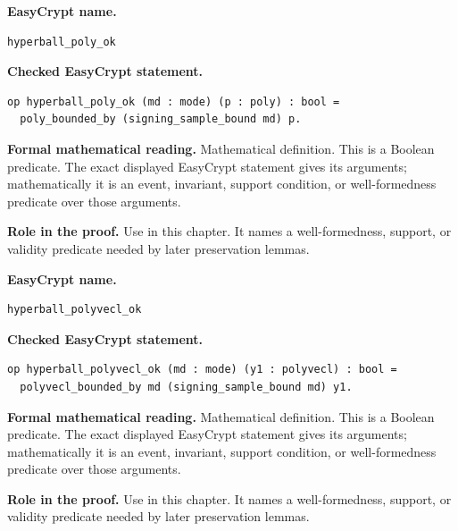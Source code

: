 \begin{formaldefinition}
\noindent\textbf{EasyCrypt name.}
\begin{lstlisting}[language=EasyCrypt,basicstyle=\ttfamily\scriptsize]
hyperball_poly_ok
\end{lstlisting}
\noindent\textbf{Checked EasyCrypt statement.}
\begin{lstlisting}[language=EasyCrypt,basicstyle=\ttfamily\scriptsize]
op hyperball_poly_ok (md : mode) (p : poly) : bool =
  poly_bounded_by (signing_sample_bound md) p.
\end{lstlisting}
\noindent\textbf{Formal mathematical reading.}
Mathematical definition. This is a Boolean predicate.  The exact displayed EasyCrypt statement gives its arguments; mathematically it is an event, invariant, support condition, or well-formedness predicate over those arguments.

\noindent\textbf{Role in the proof.}
Use in this chapter. It names a well-formedness, support, or validity predicate needed by later preservation lemmas.

\end{formaldefinition}

\begin{formaldefinition}
\noindent\textbf{EasyCrypt name.}
\begin{lstlisting}[language=EasyCrypt,basicstyle=\ttfamily\scriptsize]
hyperball_polyvecl_ok
\end{lstlisting}
\noindent\textbf{Checked EasyCrypt statement.}
\begin{lstlisting}[language=EasyCrypt,basicstyle=\ttfamily\scriptsize]
op hyperball_polyvecl_ok (md : mode) (y1 : polyvecl) : bool =
  polyvecl_bounded_by md (signing_sample_bound md) y1.
\end{lstlisting}
\noindent\textbf{Formal mathematical reading.}
Mathematical definition. This is a Boolean predicate.  The exact displayed EasyCrypt statement gives its arguments; mathematically it is an event, invariant, support condition, or well-formedness predicate over those arguments.

\noindent\textbf{Role in the proof.}
Use in this chapter. It names a well-formedness, support, or validity predicate needed by later preservation lemmas.

\end{formaldefinition}

